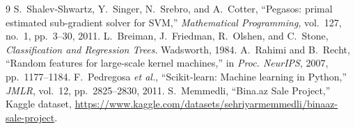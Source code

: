 \documentclass[10pt,twocolumn,a4paper]{article}
\begin{document}
\begin{thebibliography}{9}
S.~Shalev-Shwartz, Y.~Singer, N.~Srebro, and A.~Cotter,
``Pegasos: primal estimated sub-gradient solver for SVM,''
\emph{Mathematical Programming}, vol.~127, no.~1, pp.~3--30, 2011.
L.~Breiman, J.~Friedman, R.~Olshen, and C.~Stone,
\emph{Classification and Regression Trees}. Wadsworth, 1984.
A.~Rahimi and B.~Recht, ``Random features for large-scale kernel machines,''
in \emph{Proc. NeurIPS}, 2007, pp.~1177--1184.
F.~Pedregosa \emph{et al.}, ``Scikit-learn: Machine learning in Python,''
\emph{JMLR}, vol.~12, pp.~2825--2830, 2011.
S.~Memmedli, ``Bina.az Sale Project,'' Kaggle dataset,
\url{https://www.kaggle.com/datasets/sehriyarmemmedli/binaaz-sale-project}.
\end{thebibliography}
\end{document}
